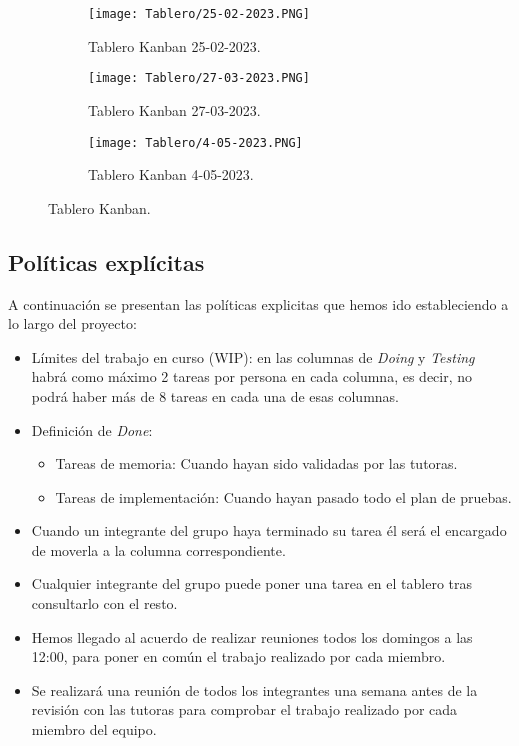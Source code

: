 \begin{figure}[ht!]
    \centering
    \begin{subfigure}{\textwidth}
      \centering
      \texttt{[image: Tablero/25-02-2023.PNG]}
      \caption{Tablero Kanban 25-02-2023.}
      \label{fig:tabFeb}
    \end{subfigure}

    \begin{subfigure}{\textwidth}
      \centering
      \texttt{[image: Tablero/27-03-2023.PNG]}
      \caption{Tablero Kanban 27-03-2023.}
      \label{fig:tabmarzo}
    \end{subfigure}

    \begin{subfigure}{\textwidth}
        \centering
        \texttt{[image: Tablero/4-05-2023.PNG]}
        \caption{Tablero Kanban 4-05-2023.}
        \label{fig:tabmayo}
      \end{subfigure}

    \caption{Tablero Kanban.}
    \label{fig:taleros}
  \end{figure}

\subsection{Políticas explícitas}
\label{sec:politicas}
A continuación se presentan las políticas explicitas que hemos ido estableciendo a lo largo del proyecto:

\begin{itemize}
    \item Límites del trabajo en curso (WIP): en las columnas de \textit{Doing} y \textit{Testing} habrá como máximo 2 tareas por persona en cada columna, es decir, no podrá haber más de 8 tareas en cada una de esas columnas.
    \item Definición de \textit{Done}:
          \begin{itemize}
              \item Tareas de memoria: Cuando hayan sido validadas por las tutoras.
              \item Tareas de implementación: Cuando hayan pasado todo el plan de pruebas.
          \end{itemize}
    \item Cuando un integrante del grupo haya terminado su tarea él será el encargado de moverla a la columna correspondiente.
    \item Cualquier integrante del grupo puede poner una tarea en el tablero tras consultarlo con el resto.
    \item Hemos llegado al acuerdo de realizar reuniones todos los domingos a las 12:00, para poner en común el trabajo realizado por cada miembro.
    \item Se realizará una reunión de todos los integrantes una semana antes de la revisión con las tutoras para comprobar el trabajo realizado por cada miembro del equipo.
\end{itemize}

